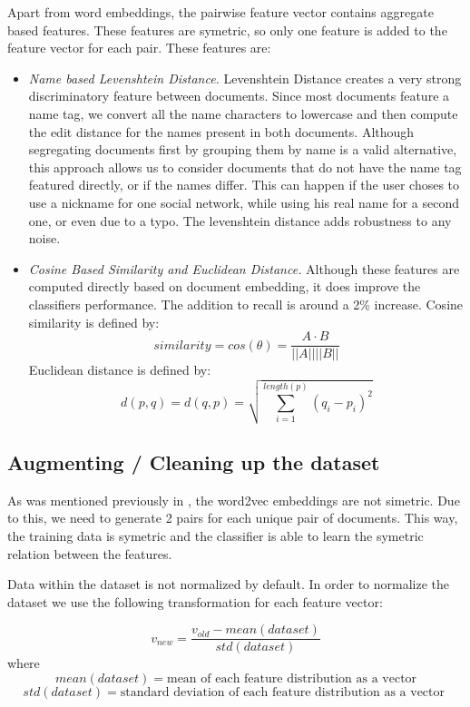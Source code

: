 Apart from word embeddings, the pairwise feature vector contains aggregate based
features. These features are symetric, so only one feature is added to the feature
vector for each pair. These features are:
\begin{itemize}
    \item
      {\em Name based Levenshtein Distance. }Levenshtein Distance creates
      a very strong discriminatory feature between documents. Since most documents
      feature a name tag, we convert all the name characters to lowercase and then
      compute the edit distance for the names present in both documents. Although
      segregating documents first by grouping them by name is a valid alternative,
      this approach allows us to consider documents that do not have the name
      tag featured directly, or if the names differ.
      This can happen if the user choses to use a nickname for one social network,
      while using his real name for a second one, or even due to a typo. The
      levenshtein distance adds robustness to any noise.
    \item
      { \em Cosine Based Similarity and Euclidean Distance. } Although these features
      are computed directly based on document embedding, it does
      improve the classifiers performance. The addition to recall
      is around a 2\% increase. Cosine similarity is defined by:
      \[ similarity = cos(\theta) = \frac{A \cdot B}{||A|| ||B||} \]
      Euclidean distance is defined by:
      \[ d(p, q) = d(q, p) = \sqrt{\sum_{i=1}^{length(p)}(q_i - p_i)^2} \]
\end{itemize}

\subsection{Augmenting / Cleaning up the dataset}
As was mentioned previously in ,
the word2vec embeddings are not simetric. Due to this, we need to generate
2 pairs for each unique pair of documents. This way, the training data is
symetric and the classifier is able to learn the symetric relation between
the features.

Data within the dataset is not normalized by default. In order to normalize the
dataset we use the following transformation for each feature vector:

\[ v_{new} = \frac{v_{old} - mean(dataset)}{std(dataset)} \]
where
\[ mean(dataset) = \mbox{mean of each feature distribution as a vector} \]
\[ std(dataset) = \mbox{standard deviation of each feature distribution as a vector } \]

